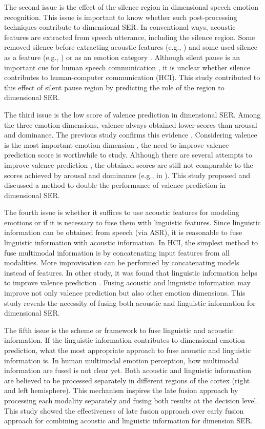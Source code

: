 The second issue is the effect of the silence region in dimensional speech
emotion recognition. This issue is important to know whether such
post-processing techniques contribute to dimensional SER. In conventional ways,
acoustic features are extracted from speech utterance, including the silence
region. Some removed silence before extracting acoustic features (e.g.,
\cite{Atmaja2019, Elbarougy2019, Mairano, Aguilar2020}) and some used silence
as a feature (e.g., \cite{Atmaja2020f, Tian2015a}) or as an emotion category
\cite{Fayek2017}. Although silent pause is an important cue for human speech
communication \cite{Ephratt2008, Tisljar-Szabo2014}, it is unclear whether
silence contributes to human-computer communication (HCI). This study
contributed to this effect of silent pause region by predicting the role of the
region to dimensional SER.

The third issue is the low score of valence prediction in dimensional SER.
Among the three emotion dimensions, valence always obtained lower scores than
arousal and dominance. The previous study confirms this evidence
\cite{Li2019b}.  Considering valence is the most important emotion dimension
\cite{Fontaine2017}, the need to improve valence prediction score is worthwhile
to study. Although there are several attempts to improve valence prediction
\cite{Zhang2019, Aldeneh2017,Sridhar2018}, the obtained scores are still not
comparable to the scores achieved by arousal and dominance (e.g., in
\cite{Sridhar2018}). This study proposed and discussed a method to double the
performance of valence prediction in dimensional SER.

The fourth issue is whether it suffices to use acoustic features for modeling
emotions or if it is necessary to fuse them with linguistic features. Since
linguistic information can be obtained from speech (via ASR), it is reasonable
to fuse linguistic information with acoustic information. In HCI, the simplest
method to fuse multimodal information is by concatenating input features from
all modalities. More improvisation can be performed by concatenating models
instead of features. In other study, it was found that linguistic information
helps to improve valence prediction \cite{Karadogan2012}. Fusing acoustic and
linguistic information may improve not only valence prediction but also other
emotion dimensions. This study reveals the necessity of fusing both acoustic
and linguistic information for dimensional SER.

The fifth issue is the scheme or framework to fuse linguistic and acoustic
information. If the linguistic information contributes to dimensional emotion
prediction, what the most appropriate approach to fuse acoustic and linguistic
information is. In human multimodal emotion perception, how multimodal
information are fused is not clear yet. Both acoustic and linguistic
information are believed to be processed separately in different regions of the
cortex (right and left hemisphere). This mechanism inspires the late fusion
approach by processing each modality separately and fusing both results at the
decision level. This study showed the effectiveness of late fusion approach
over early fusion approach for combining acoustic and linguistic information
for dimension SER.


